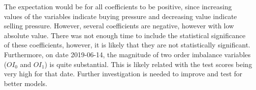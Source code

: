 \documentclass[english, 11pt, a4paper]{article}
\begin{document}
\begin{table}[H]
\end{table}

The expectation would be for all coefficients to be positive, since increasing values of the
variables indicate buying pressure and decreasing value indicate selling pressure. However, several
coefficients are negative, however with low absolute value. There was not enough time to include the
statistical significance of these coefficients, however, it is likely that they are not
statistically significant. Furthermore, on date 2019-06-14, the magnitude of two order imbalance
variables ($OI_0$ and $OI_1$) is quite substantial. This is likely related with the test
scores being very high for that date. Further investigation is needed to improve and test for better models. 



%
\end{document}
